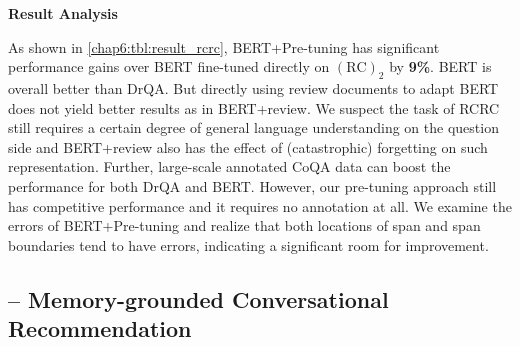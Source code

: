 \begin{table}
    \centering
    \caption{RCRC on EM (Exact Match) and F1.}
\label{chap6:tbl:result_rcrc}
\vspace{-7mm}
\end{table}

\textbf{Result Analysis}

As shown in \ref{chap6:tbl:result_rcrc}, 
BERT+Pre-tuning has significant performance gains over BERT fine-tuned directly on $(\text{RC})_2$ by \textbf{9\%}.
BERT is overall better than DrQA.
But directly using review documents to adapt BERT does not yield better results as in BERT+review.
We suspect the task of RCRC still requires a certain degree of general language understanding on the question side and BERT+review also has the effect of (catastrophic) forgetting \cite{kirkpatrick2017overcoming} on such representation.
Further, large-scale annotated CoQA data can boost the performance for both DrQA and BERT.
However, our pre-tuning approach still has competitive performance and it requires no annotation at all.
We examine the errors of BERT+Pre-tuning and realize that both locations of span and span boundaries tend to have errors, indicating a significant room for improvement.

\subsection{-- Memory-grounded Conversational Recommendation}
\label{chap6:sec:mgcr}

